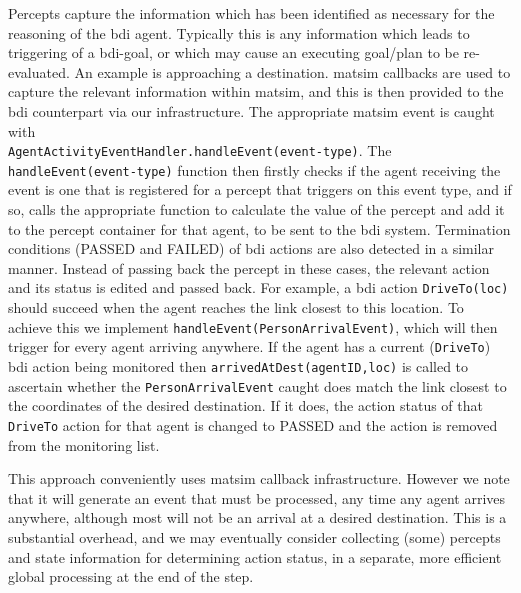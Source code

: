 Percepts capture the information which has been identified as
necessary for the reasoning of the \gls{bdi} agent. Typically this is any
information which leads to triggering of a \gls{bdi}-goal, or which may
cause an executing goal/plan to be re-evaluated. An example is
approaching a destination. \gls{matsim} callbacks are used to capture the relevant
information within \gls{matsim}, and this is then provided to the \gls{bdi}
counterpart via our infrastructure. The appropriate \gls{matsim} event is
caught with
\\ \lstinline{AgentActivityEventHandler.handleEvent(event-type)}.  The
\lstinline{handleEvent(event-type)} function then firstly checks if the
agent receiving the event is one that is registered for a percept that
triggers on this event type, and if so, calls the appropriate function
to calculate the value of the percept and add it to the percept
container for that agent, to be sent to the \gls{bdi} system. Termination
conditions (PASSED and FAILED) of \gls{bdi} actions are also detected in a similar
manner.
Instead of passing back the percept in these cases, the relevant
action and its status is edited and passed back.  For example, a \gls{bdi}
action \lstinline{DriveTo(loc)} should succeed when the agent reaches the
link closest to this location. To achieve this we implement 
\lstinline{handleEvent(PersonArrivalEvent)}, which will then trigger for every
agent arriving anywhere. If the agent has a current (\lstinline{DriveTo})
\gls{bdi} action being monitored then \lstinline{arrivedAtDest(agentID,loc)} is
called to ascertain whether the \lstinline{PersonArrivalEvent} caught
does match the link closest to the coordinates of the desired
destination. If it does, the action status of that \lstinline{DriveTo} action for
that agent is changed to PASSED and the action is removed from the monitoring
list.

This approach conveniently uses \gls{matsim} callback
infrastructure. However we note that it will generate an event that
must be processed, any time any agent arrives anywhere, although most
will not be an arrival at a desired destination. This is a
substantial overhead, and we may eventually consider collecting (some)
percepts and state information for determining action status, in a
separate, more efficient global processing at the end of the step.


